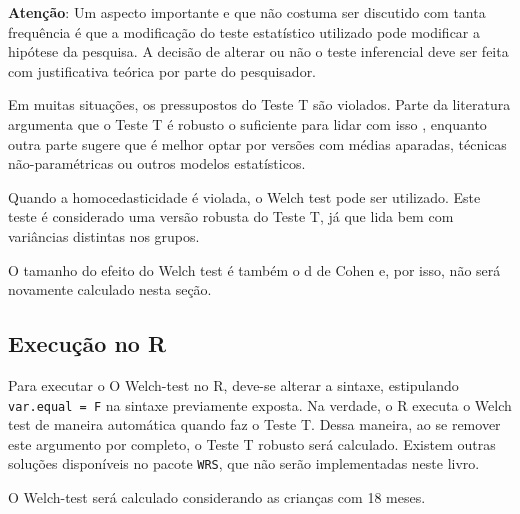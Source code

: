\documentclass[
]{book}
\newenvironment{Shaded}{\begin{snugshade}}{\end{snugshade}}
\newcommand{\DataTypeTok}[1]{\textcolor[rgb]{0.13,0.29,0.53}{#1}}
\newcommand{\DecValTok}[1]{\textcolor[rgb]{0.00,0.00,0.81}{#1}}
\newcommand{\KeywordTok}[1]{\textcolor[rgb]{0.13,0.29,0.53}{\textbf{#1}}}
\newcommand{\NormalTok}[1]{#1}
\newcommand{\OperatorTok}[1]{\textcolor[rgb]{0.81,0.36,0.00}{\textbf{#1}}}
\newcommand{\OtherTok}[1]{\textcolor[rgb]{0.56,0.35,0.01}{#1}}
\newcommand{\StringTok}[1]{\textcolor[rgb]{0.31,0.60,0.02}{#1}}
\begin{document}
\textbf{Atenção}: Um aspecto importante e que não costuma ser discutido com tanta frequência é que a modificação do teste estatístico utilizado pode modificar a hipótese da pesquisa. A decisão de alterar ou não o teste inferencial deve ser feita com justificativa teórica por parte do pesquisador.

Em muitas situações, os pressupostos do Teste T são violados. Parte da literatura argumenta que o Teste T é robusto o suficiente para lidar com isso \citep{Lumley2002}, enquanto outra parte sugere que é melhor optar por versões com médias aparadas, técnicas não-paramétricas \citep{Field2017} ou outros modelos estatísticos.

Quando a homocedasticidade é violada, o Welch test pode ser utilizado. Este teste é considerado uma versão robusta do Teste T, já que lida bem com variâncias distintas nos grupos.

O tamanho do efeito do Welch test é também o d de Cohen e, por isso, não será novamente calculado nesta seção.

\hypertarget{execuuxe7uxe3o-no-r-4}{%
\subsection{Execução no R}\label{execuuxe7uxe3o-no-r-4}}

Para executar o O Welch-test no R, deve-se alterar a sintaxe, estipulando \texttt{var.equal\ =\ F} na sintaxe previamente exposta. Na verdade, o R executa o Welch test de maneira automática quando faz o Teste T. Dessa maneira, ao se remover este argumento por completo, o Teste T robusto será calculado. Existem outras soluções disponíveis no pacote \texttt{WRS}, que não serão implementadas neste livro.

O Welch-test será calculado considerando as crianças com 18 meses.

\begin{Shaded}
\end{Shaded}
\end{document}
